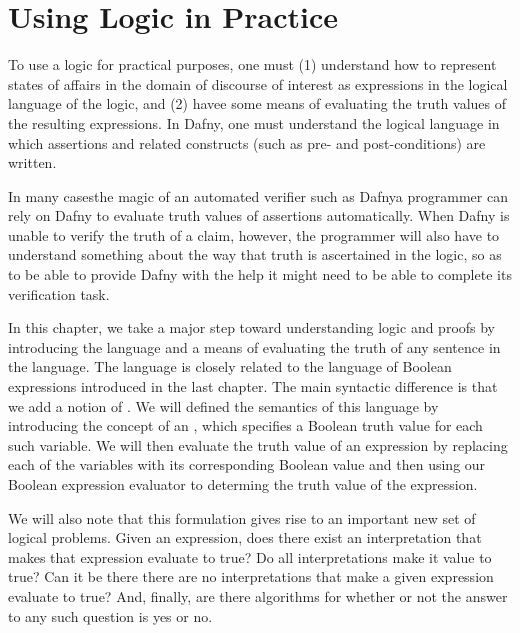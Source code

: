 \documentclass[letterpaper,10pt,english]{sphinxmanual}
\begin{document}
\section{Using Logic in Practice}
\label{\detokenize{09-propositional-logic:using-logic-in-practice}}
To use a logic for practical purposes, one must (1) understand how to
represent states of affairs in the domain of discourse of interest as
expressions in the logical language of the logic, and (2) havee some
means of evaluating the truth values of the resulting expressions. In
Dafny, one must understand the logical language in which assertions
and related constructs (such as pre- and post-conditions) are written.

In many cases\textendash{}the magic of an automated verifier such as Dafny\textendash{}a
programmer can rely on Dafny to evaluate truth values of assertions
automatically. When Dafny is unable to verify the truth of a claim,
however, the programmer will also have to understand something about
the way that truth is ascertained in the logic, so as to be able to
provide Dafny with the help it might need to be able to complete its
verification task.

In this chapter, we take a major step toward understanding logic and
proofs by introducing the language  and a means
of evaluating the truth of any sentence in the language. The language
is closely related to the language of Boolean expressions introduced
in the last chapter. The main syntactic difference is that we add a
notion of . We will defined the semantics of
this language by introducing the concept of an , which
specifies a Boolean truth value for each such variable. We will then
evaluate the truth value of an expression  by replacing each of the
variables with its corresponding Boolean value and then using our
Boolean expression evaluator to determing the truth value of the
expression.

We will also note that this formulation gives rise to an important new
set of logical problems. Given an expression, does there exist an
interpretation that makes that expression evaluate to true? Do all
interpretations make it value to true? Can it be there there are no
interpretations that make a given expression evaluate to true?  And,
finally, are there  algorithms for  whether or
not the answer to any such question is yes or no.
\end{document}
